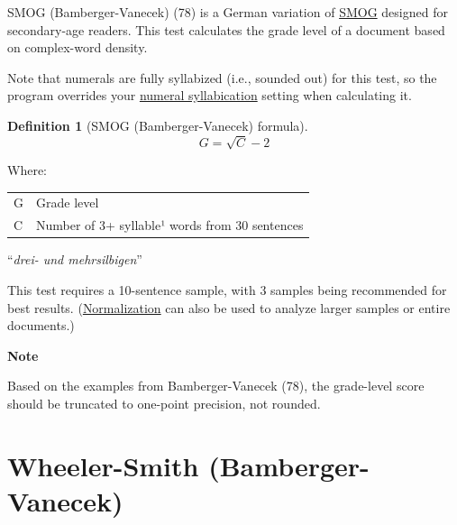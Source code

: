\documentclass[
]{book}
\newenvironment{notesection}
    {
    \begin{tcolorbox}[colframe=mediumblue,colback=lightblue,coltext=mediumblue,arc=3mm]
    \faLightbulb[regular] \textbf{Note} \newline
    }
    {
    \end{tcolorbox}
    }
\theoremstyle{definition}
\newtheorem{definition}{Definition}[chapter]
\theoremstyle{definition}
\theoremstyle{definition}
\theoremstyle{definition}
\theoremstyle{remark}
\begin{document}
SMOG (Bamberger-Vanecek) (78) is a German variation of \protect\hyperlink{smog-test}{SMOG} designed for secondary-age readers. This test calculates the grade level of a document based on complex-word density.

Note that numerals are fully syllabized (i.e., sounded out) for this test, so the program overrides your \protect\hyperlink{numsyllable}{numeral syllabication} setting when calculating it.

\begin{definition}[SMOG (Bamberger-Vanecek) formula]
\protect\hypertarget{def:smogde}{}{\label{def:smogde} {} }\[
G = \sqrt{C} - 2
\]
\end{definition}

Where:

\begin{table}
\centering
\begin{threeparttable}
\begin{tabular}[t]{ll}
\toprule
G & Grade level\\
C & Number of 3+ syllable¹ words from 30 sentences\\
\bottomrule
\end{tabular}
\begin{tablenotes}
\item[1] “\textit{drei- und mehrsilbigen}”
\end{tablenotes}
\end{threeparttable}
\end{table}

This test requires a 10-sentence sample, with 3 samples being recommended for best results. (\protect\hyperlink{glossary}{Normalization} can also be used to analyze larger samples or entire documents.)

\begin{notesection}
Based on the examples from Bamberger-Vanecek (78), the grade-level score should be truncated to one-point precision, not rounded.

\end{notesection}

\newpage

\hypertarget{wheeler-smith-bamberger-vanecek}{%
\section{\texorpdfstring{Wheeler-Smith (Bamberger-Vanecek)}{Wheeler-Smith (Bamberger-Vanecek)}}\label{wheeler-smith-bamberger-vanecek}}
\end{document}
